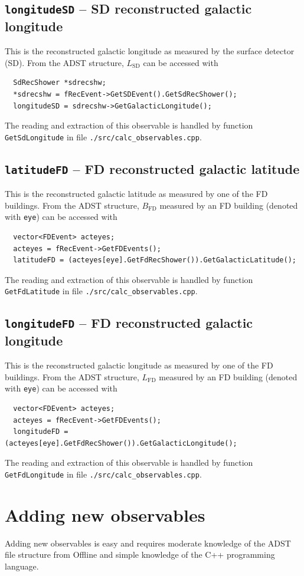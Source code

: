 \documentclass[12pt,a4paper]{report}
\begin{document}
\subsection{\texttt{longitudeSD} -- SD reconstructed galactic longitude}
This is the reconstructed galactic longitude as measured by the surface detector (SD). From the ADST structure, $L_{\textrm{SD}}$ can be accessed with
\begin{verbatim}
  SdRecShower *sdrecshw;
  *sdrecshw = fRecEvent->GetSDEvent().GetSdRecShower();
  longitudeSD = sdrecshw->GetGalacticLongitude();
\end{verbatim}
The reading and extraction of this observable is handled by function \texttt{GetSdLongitude} in file \texttt{./src/calc\_observables.cpp}.

\subsection{\texttt{latitudeFD} -- FD reconstructed galactic latitude}
This is the reconstructed galactic latitude as measured by one of the FD buildings. From the ADST structure, $B_{\textrm{FD}}$ measured by an FD building (denoted with \texttt{eye}) can be accessed with
\begin{verbatim}
  vector<FDEvent> acteyes;
  acteyes = fRecEvent->GetFDEvents();
  latitudeFD = (acteyes[eye].GetFdRecShower()).GetGalacticLatitude();
\end{verbatim}
The reading and extraction of this observable is handled by function \texttt{GetFdLatitude} in file \texttt{./src/calc\_observables.cpp}.
\subsection{\texttt{longitudeFD} -- FD reconstructed galactic longitude}
This is the reconstructed galactic longitude as measured by one of the FD buildings. From the ADST structure, $L_{\textrm{FD}}$ measured by an FD building (denoted with \texttt{eye}) can be accessed with
\begin{verbatim}
  vector<FDEvent> acteyes;
  acteyes = fRecEvent->GetFDEvents();
  longitudeFD = (acteyes[eye].GetFdRecShower()).GetGalacticLongitude();
\end{verbatim}
The reading and extraction of this observable is handled by function \texttt{GetFdLongitude} in file \texttt{./src/calc\_observables.cpp}.

\section{Adding new observables} \label{ch:add-obs}
Adding new observables is easy and requires moderate knowledge of the ADST file structure from Offline and simple knowledge of the C++ programming language.
\end{document}
